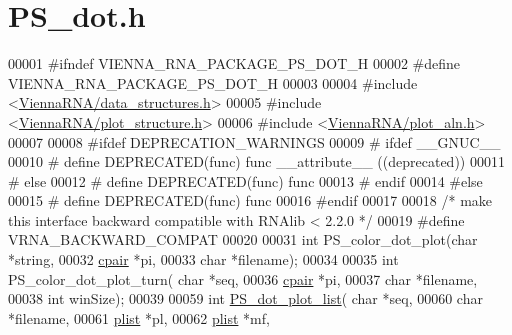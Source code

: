 \hypertarget{PS__dot_8h_source}{}\section{P\+S\+\_\+dot.\+h}
\label{PS__dot_8h_source}

\begin{DoxyCode}
00001 \textcolor{preprocessor}{#ifndef VIENNA\_RNA\_PACKAGE\_PS\_DOT\_H}
00002 \textcolor{preprocessor}{#define VIENNA\_RNA\_PACKAGE\_PS\_DOT\_H}
00003 
00004 \textcolor{preprocessor}{#include <\hyperlink{data__structures_8h}{ViennaRNA/data\_structures.h}>}
00005 \textcolor{preprocessor}{#include <\hyperlink{plot__structure_8h}{ViennaRNA/plot\_structure.h}>}
00006 \textcolor{preprocessor}{#include <\hyperlink{plot__aln_8h}{ViennaRNA/plot\_aln.h}>}
00007 
00008 \textcolor{preprocessor}{#ifdef DEPRECATION\_WARNINGS}
00009 \textcolor{preprocessor}{# ifdef \_\_GNUC\_\_}
00010 \textcolor{preprocessor}{#  define DEPRECATED(func) func \_\_attribute\_\_ ((deprecated))}
00011 \textcolor{preprocessor}{# else}
00012 \textcolor{preprocessor}{#  define DEPRECATED(func) func}
00013 \textcolor{preprocessor}{# endif}
00014 \textcolor{preprocessor}{#else}
00015 \textcolor{preprocessor}{# define DEPRECATED(func) func}
00016 \textcolor{preprocessor}{#endif}
00017 
00018 \textcolor{comment}{/* make this interface backward compatible with RNAlib < 2.2.0 */}
00019 \textcolor{preprocessor}{#define VRNA\_BACKWARD\_COMPAT}
00020 
00031 \textcolor{keywordtype}{int} PS\_color\_dot\_plot(\textcolor{keywordtype}{char} *\textcolor{keywordtype}{string},
00032                       \hyperlink{group__data__structures_structvrna__cpair__s}{cpair} *pi,
00033                       \textcolor{keywordtype}{char} *filename);
00034 
00035 \textcolor{keywordtype}{int} PS\_color\_dot\_plot\_turn( \textcolor{keywordtype}{char} *seq,
00036                             \hyperlink{group__data__structures_structvrna__cpair__s}{cpair} *pi,
00037                             \textcolor{keywordtype}{char} *filename,
00038                             \textcolor{keywordtype}{int} winSize);
00039 
00059 \textcolor{keywordtype}{int} \hyperlink{group__plotting__utils_ga00ea223b5cf02eb2faae5ff29f0d5e12}{PS\_dot\_plot\_list}( \textcolor{keywordtype}{char} *seq,
00060                       \textcolor{keywordtype}{char} *filename,
00061                       \hyperlink{group__data__structures_structvrna__plist__s}{plist} *pl,
00062                       \hyperlink{group__data__structures_structvrna__plist__s}{plist} *mf,

\end{DoxyCode}
